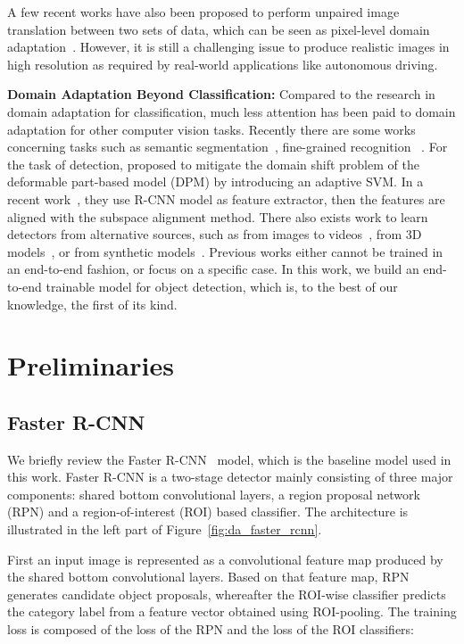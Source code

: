 \documentclass[10pt,twocolumn,letterpaper]{article}
\begin{document}
A few recent works have also been proposed to perform unpaired image translation between two sets of data, which can be seen as pixel-level domain adaptation~\cite{zhu2017unpaired,kim2017learning,yi2017dualgan,liu2017unsupervised}. However, it is still a challenging issue to produce realistic images in high resolution as required by real-world applications like autonomous driving. 

\textbf{Domain Adaptation Beyond Classification:} Compared to the research in domain adaptation for classification, much less attention has been paid to domain adaptation for other computer vision tasks. Recently there are some works concerning tasks such as semantic segmentation~\cite{chen2017road, hoffman2016fcns,zhang2017curriculum}, fine-grained recognition~\cite{gebru2017fine} \etc. For the task of detection, \cite{xu2014domain} proposed to mitigate the domain shift problem of the deformable part-based model (DPM) by introducing an adaptive SVM. In a recent work~\cite{raj2015subspace}, they use R-CNN model as feature extractor, then the features are aligned with the subspace alignment method. There also exists work to learn detectors from alternative sources, such as from images to videos~\cite{tang2012shifting}, from 3D models~\cite{peng2015learning,sun2014virtual}, or from synthetic models~\cite{hattori2015learning}. Previous works either cannot be trained in an end-to-end fashion, or focus on a specific case. In this work, we build an end-to-end trainable model for object detection, which is, to the best of our knowledge, the first of its kind. 

\section{Preliminaries}
\subsection{Faster R-CNN} 
We briefly review the Faster R-CNN~\cite{zhang2016Faster} model, which is the baseline model used in this work. Faster R-CNN is a two-stage detector mainly consisting of three major components: shared bottom convolutional layers, a region proposal network (RPN) and a region-of-interest (ROI) based classifier. The architecture is illustrated in the left part of Figure~\ref{fig:da_faster_rcnn}. 

First an input image is represented as a convolutional feature map produced by the shared bottom convolutional layers. Based on that feature map, RPN generates candidate object proposals, whereafter the ROI-wise classifier predicts the category label from a feature vector obtained using ROI-pooling. The training loss is composed of the loss of the RPN and the loss of the ROI classifiers: 
\end{document}
